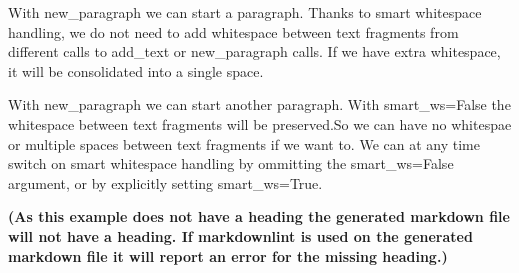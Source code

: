 \documentclass[a4paper]{report}
\begin{document}
With new\_paragraph we can start a paragraph. Thanks to smart whitespace handling, we do not need to add whitespace between text fragments from different calls to add\_text or new\_paragraph calls. If we have extra whitespace, it will be consolidated into a single space.

With new\_paragraph we can start another paragraph.  With smart\_ws=False the whitespace between text  fragments will be preserved.So we can have no whitespae or multiple spaces between text fragments if we want to. We can at any time switch on smart whitespace handling by ommitting the smart\_ws=False argument, or by explicitly setting smart\_ws=True.

\textbf{(As this example does not have a heading the generated markdown file will not have a heading. If markdownlint is used on the generated markdown file it will report an error for the missing heading.)}
\end{document}
